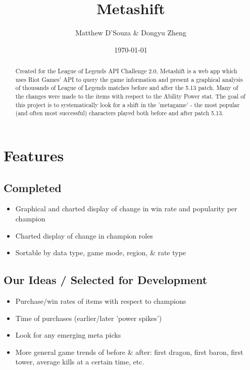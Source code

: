 \documentclass{article}
\title{Metashift}
\date{\today}
\author{Matthew D'Souza \& Dongyu Zheng}
\begin{document}
\maketitle
{}

\newpage
\begin{abstract}
    Created for the League of Legends API Challenge 2.0, Metashift is a web app which uses Riot Games' API to query the game information and present a graphical analysis of thousands of League of Legends matches before and after the 5.13 patch. Many of the changes were made to the items with respect to the Ability Power stat. The goal of this project is to systematically look for a shift in the 'metagame' - the most popular (and often most successful) characters played both before and after patch 5.13.
\end{abstract}

\newpage
\tableofcontents

\newpage
{}



\section{Features}

\subsection{Completed}
\begin{itemize}
    \item Graphical and charted display of change in win rate and popularity per champion
    \item Charted display of change in champion roles 
    \item Sortable by data type, game mode, region, \& rate type
\end{itemize}

\subsection{Our Ideas / Selected for Development}
\begin{itemize}
    \item Purchase/win rates of items with respect to champions
    \item Time of purchases (earlier/later 'power spikes')
    \item Look for any emerging meta picks
    \item More general game trends of before \& after: first dragon, first baron, first tower, average kills at a certain time, etc.
\end{itemize}
\end{document}
